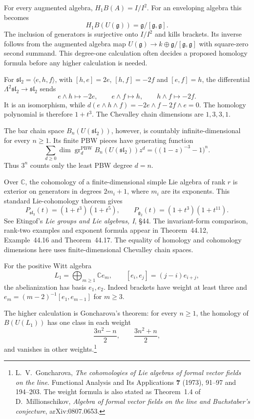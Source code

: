 For every augmented algebra, $H_1B(A)=I/I^2$.
For an enveloping algebra this becomes
\[
 H_1B(U(\mathfrak g))=\mathfrak g/[\mathfrak g,\mathfrak g].
\]
The inclusion of generators is surjective onto $I/I^2$ and kills brackets.
Its inverse follows from the augmented algebra map
$U(\mathfrak g)\to k\oplus\mathfrak g/[\mathfrak g,\mathfrak g]$ with square-zero second summand.
This degree-one calculation often decides a proposed homology formula before any higher calculation is needed.

For $\mathfrak{sl}_2=\langle e,h,f\rangle$, with
$[h,e]=2e$, $[h,f]=-2f$ and $[e,f]=h$, the differential
$\Lambda^2\mathfrak{sl}_2\to\mathfrak{sl}_2$ sends
\[
 e\wedge h\mapsto-2e,\qquad e\wedge f\mapsto h,
 \qquad h\wedge f\mapsto-2f.
\]
It is an isomorphism, while
$d(e\wedge h\wedge f)=-2e\wedge f-2f\wedge e=0$.
The homology polynomial is therefore $1+t^3$.
The Chevalley chain dimensions are $1,3,3,1$.

The bar chain space $B_n(U(\mathfrak{sl}_2))$, however, is countably infinite-dimensional for every $n\ge1$.
Its finite PBW pieces have generating function
\[
 \sum_{d\ge0}\dim\operatorname{gr}^{\mathrm{PBW}}_dB_n(U(\mathfrak{sl}_2))z^d
 =\bigl((1-z)^{-3}-1\bigr)^n.
\]
Thus $3^n$ counts only the least PBW degree $d=n$.

Over $\mathbb C$, the cohomology of a finite-dimensional simple Lie algebra of rank $r$ is exterior on generators in degrees $2m_i+1$, where $m_i$ are its exponents.
This standard Lie-cohomology theorem gives
\[
 P_{\mathfrak{sl}_3}(t)=(1+t^3)(1+t^5),\qquad
 P_{\mathfrak g_2}(t)=(1+t^3)(1+t^{11}).
\]
See Etingof's \emph{Lie groups and Lie algebras, I}, \S44.
The invariant-form comparison, rank-two examples and exponent formula appear in Theorem~44.12, Example~44.16 and Theorem~44.17.
The equality of homology and cohomology dimensions here uses finite-dimensional Chevalley chain spaces.

For the positive Witt algebra
\[
 L_1=\bigoplus_{m\ge1}\mathbb C e_m,\qquad [e_i,e_j]=(j-i)e_{i+j},
\]
the abelianization has basis $e_1,e_2$.
Indeed brackets have weight at least three and
$e_m=(m-2)^{-1}[e_1,e_{m-1}]$ for $m\ge3$.

The higher calculation is Goncharova's theorem: for every $n\ge1$, the homology of $B(U(L_1))$ has one class in each weight
\[
 \frac{3n^2-n}{2},\qquad \frac{3n^2+n}{2},
\]
and vanishes in other weights.\footnote{L.~V.~Goncharova, \emph{The cohomologies of Lie algebras of formal vector fields on the line}. Functional Analysis and Its Applications \textbf{7} (1973), 91--97 and 194--203. The weight formula is also stated as Theorem~1.4 of D.~Millionschikov, \emph{Algebra of formal vector fields on the line and Buchstaber's conjecture}, arXiv:0807.0653.}

